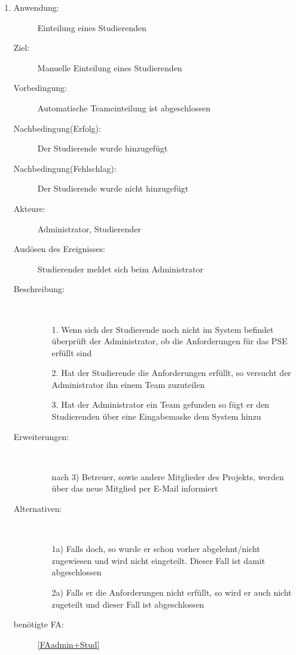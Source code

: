 \documentclass[parskip=full]{scrartcl}
\newcommand{\swtLabel}[1]{\textbf{/#1\arabic*0/}}
\begin{document}
\begin{enumerate} [label=\swtLabel{A}]
  
  \item
  \begin{description}
  \item[Anwendung:] Einteilung eines Studierenden
  \item[Ziel:] Manuelle Einteilung eines Studierenden
  	\item[Vorbedingung:] Automatische Teameinteilung ist abgeschlossen
  	\item[Nachbedingung(Erfolg):] Der Studierende wurde hinzugefügt
  	\item[Nachbedingung(Fehlschlag):] Der Studierende wurde nicht hinzugefügt
  	\item[Akteure:] Administrator, Studierender
  	\item[Auslösen des Ereignisses:] Studierender meldet sich beim Administrator
  	\item[Beschreibung:]~
  	 \begin{enumerate} 
  	   \item[1.] Wenn sich der Studierende noch nicht im System befindet
  	   überprüft der Administrator, ob die Anforderungen für das PSE erfüllt sind
  	   \item[2.] Hat der Studierende die Anforderungen erfüllt, so versucht der
  	   Administrator ihn einem Team zuzuteilen
  	   \item[3.] Hat der Administrator ein Team gefunden so fügt er den
  	   Studierenden über eine Eingabemaske dem System hinzu
  	 \end{enumerate}
  	\item[Erweiterungen:]~
  	 \begin{enumerate}
  	   \item [nach 3)] Betreuer, sowie andere Mitglieder des Projekts, werden
  	   über das neue Mitglied per E-Mail informiert 
  	 \end{enumerate}  
  	\item[Alternativen:] ~
  	 \begin{enumerate}
  	  \item[1a)] Falls doch, so wurde er schon vorher abgelehnt/nicht zugewiesen
  	  und wird nicht eingeteilt. Dieser Fall ist damit abgeschlossen
  	  \item [2a)] Falls er die Anforderungen nicht erfüllt, so wird er auch nicht
  	  zugeteilt und dieser Fall ist abgeschlossen
  	 \end{enumerate}  
  	 \item[benötigte FA:] \ref{FAadmin+Stud}
  \end{description}
   

\end{enumerate}
\end{document}
